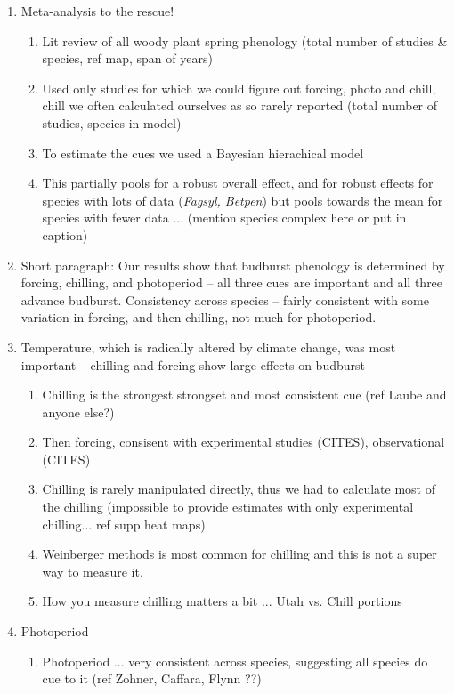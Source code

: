 \documentclass[11pt,letter]{article}
\begin{document}
{\begin{enumerate}
\item Meta-analysis to the rescue!
\begin{enumerate}
\item Lit review of all woody plant spring phenology (total number of studies \& species, ref map, span of years)
\item Used only studies for which we could figure out forcing, photo and chill, chill we often calculated ourselves as so rarely reported (total number of studies, species in model)
\item To estimate the cues we used a Bayesian hierachical model 
\item This partially pools for a robust overall effect, and for robust effects for species with lots of data (\emph{Fagsyl, Betpen}) but pools towards the mean for species with fewer data ... (mention species complex here or put in caption)
\end{enumerate}
\item Short paragraph: Our results show that budburst phenology is determined by forcing, chilling, and photoperiod -- all three cues are important and all three advance budburst. Consistency across species -- fairly consistent with some variation in forcing, and then chilling, not much for photoperiod. 
\item Temperature, which is radically altered by climate change, was most important -- chilling and forcing show large effects on budburst
\begin{enumerate}
\item Chilling is the strongest strongset and most consistent cue (ref Laube and anyone else?)
\item Then forcing, consisent with experimental studies (CITES), observational (CITES)
\item Chilling is rarely manipulated directly, thus we had to calculate most of the chilling (impossible to provide estimates with only experimental chilling... ref supp heat maps)
\item Weinberger methods is most common for chilling and this is not a super way to measure it.
\item How you measure chilling matters a bit ... Utah vs. Chill portions
\end{enumerate}
\item Photoperiod
\begin{enumerate}
\item Photoperiod ... very consistent across species, suggesting all species do cue to it (ref Zohner, Caffara, Flynn ??)

\end{enumerate}
\end{enumerate}}
\end{document}
